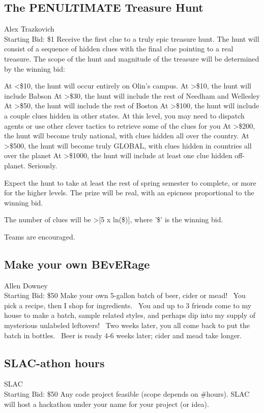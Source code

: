 \documentclass[11pt]{article}
\begin{document}
\subsection{The PENULTIMATE Treasure Hunt}
Alex Trazkovich
\\
Starting Bid: \$1
\newline
Receive the first clue to a truly epic treasure hunt.  The hunt will consist of a sequence of hidden clues with the final clue pointing to a real treasure.  The scope of the hunt and magnitude of the treasure will be determined by the winning bid:

At <\$10, the hunt will occur entirely on Olin's campus.
At >\$10, the hunt will include Babson
At >\$30, the hunt will include the rest of Needham and Wellesley
At >\$50, the hunt will include the rest of Boston
At >\$100, the hunt will include a couple clues hidden in other states.  At this level, you may need to dispatch agents or use other clever tactics to retrieve some of the clues for you
At >\$200, the hunt will become truly national, with clues hidden all over the country. 
At >\$500, the hunt will become truly GLOBAL, with clues hidden in countries all over the planet
At >\$1000, the hunt will include at least one clue hidden off-planet. Seriously.

Expect the hunt to take at least the rest of spring semester to complete, or more for the higher levels.  The prize will be real, with an epicness proportional to the winning bid. 

The number of clues will be >[5 x ln(\$)], where '\$' is the winning bid.

Teams are encouraged.
\subsection{Make your own BEvERage}
Allen Downey
\\
Starting Bid: \$50
\newline
Make your own 5-gallon batch of beer, cider or mead!  You pick a recipe, then I shop for ingredients.  You and up to 3 friends come to my house to make a batch, sample related styles, and perhaps dip into my supply of mysterious unlabeled leftovers!  Two weeks later, you all come back to put the batch in bottles.  Beer is ready 4-6 weeks later; cider and mead take longer.
\subsection{SLAC-athon hours}
SLAC
\\
Starting Bid: \$50
\newline
Any code project feasible (scope depends on \#hours). SLAC will host a hackathon under your name for your project (or idea). 
\end{document}
